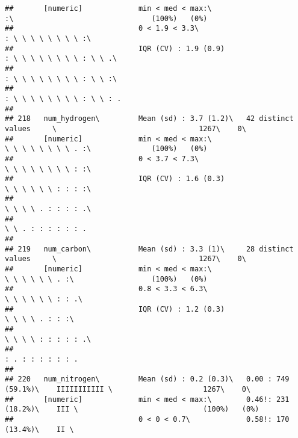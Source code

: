 \documentclass[]{article}
\begin{document}
\begin{verbatim}
##       [numeric]             min < med < max:\                               :\                                (100%)   (0%)     
##                             0 < 1.9 < 3.3\                                  : \ \ \ \ \ \ \ \ :\                                
##                             IQR (CV) : 1.9 (0.9)                            : \ \ \ \ \ \ \ \ : \ \ .\                          
##                                                                             : \ \ \ \ \ \ \ \ : \ \ :\                          
##                                                                             : \ \ \ \ \ \ \ \ : \ \ : .                         
## 
## 218   num_hydrogen\         Mean (sd) : 3.7 (1.2)\   42 distinct values     \                                 1267\    0\       
##       [numeric]             min < med < max:\                               \ \ \ \ \ \ \ \ . :\              (100%)   (0%)     
##                             0 < 3.7 < 7.3\                                  \ \ \ \ \ \ \ \ : :\                                
##                             IQR (CV) : 1.6 (0.3)                            \ \ \ \ \ \ : : : :\                                
##                                                                             \ \ \ \ . : : : : .\                                
##                                                                             \ \ . : : : : : : .                                 
## 
## 219   num_carbon\           Mean (sd) : 3.3 (1)\     28 distinct values     \                                 1267\    0\       
##       [numeric]             min < med < max:\                               \ \ \ \ \ \ . :\                  (100%)   (0%)     
##                             0.8 < 3.3 < 6.3\                                \ \ \ \ \ \ : : .\                                  
##                             IQR (CV) : 1.2 (0.3)                            \ \ \ \ . : : :\                                    
##                                                                             \ \ \ \ : : : : : .\                                
##                                                                             : . : : : : : : .                                   
## 
## 220   num_nitrogen\         Mean (sd) : 0.2 (0.3)\   0.00 : 749 (59.1%)\    IIIIIIIIIII \                     1267\    0\       
##       [numeric]             min < med < max:\        0.46!: 231 (18.2%)\    III \                             (100%)   (0%)     
##                             0 < 0 < 0.7\             0.58!: 170 (13.4%)\    II \                                                

\end{verbatim}
\end{document}
